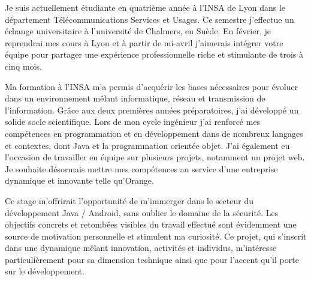 \documentclass[11pt, a4paper]{awesome-cv}
\begin{document}
\makecvheader[R]


\makelettertitle

\begin{cvletter}

Je suis actuellement étudiante en quatrième année à l'INSA de Lyon dans le département Télécommunications Services et Usages. Ce semestre j'effectue un échange universitaire à l'université de Chalmers, en Suède. En février, je reprendrai mes cours à Lyon et à partir de mi-avril j'aimerais intégrer votre équipe pour partager une expérience professionnelle riche et stimulante de trois à cinq mois.

\vspace{2mm} %

Ma formation à l'INSA m'a permis d'acquérir les bases nécessaires pour évoluer dans un environnement mêlant informatique, réseau et transmission de l'information. Grâce aux deux premières années préparatoires, j'ai développé un solide socle scientifique. Lors de mon cycle ingénieur j'ai renforcé mes compétences en programmation et en développement dans de nombreux langages et contextes, dont Java et la programmation orientée objet. J'ai également eu l'occasion de travailler en équipe sur plusieurs projets, notamment un projet web. Je souhaite désormais mettre mes compétences au service d'une entreprise dynamique et innovante telle qu'Orange.

\vspace{2mm} %

Ce stage m'offrirait l'opportunité de m'immerger dans le secteur du développement Java / Android, sans oublier le domaine de la sécurité. Les objectifs concrets et retombées visibles du travail effectué sont évidemment une source de motivation personnelle et stimulent ma curiosité. Ce projet, qui s'inscrit dans une dynamique mêlant innovation, activités et individus, m'intéresse particulièrement pour sa dimension technique ainsi que pour l'accent qu'il porte sur le développement.  %


\end{cvletter}
\end{document}
